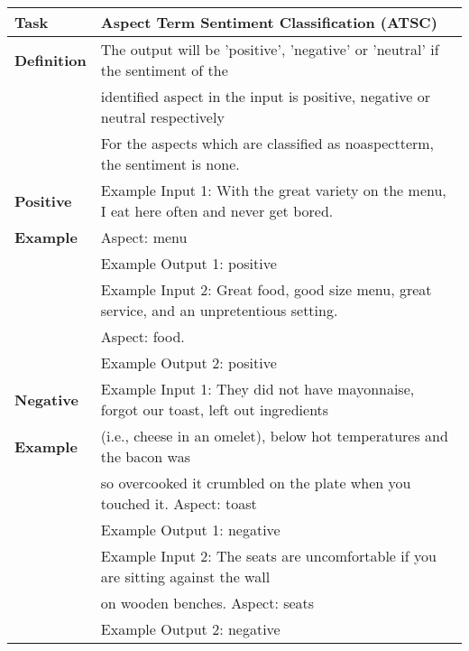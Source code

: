 \documentclass[11pt]{article}
\begin{document}
\begin{table*}[]
\begin{tabular}{ll}
\hline
\textbf{Task}             & Aspect Term Sentiment Classification (ATSC)                                                  \\ \hline
\textbf{Definition} & The output will be 'positive', 'negative' or 'neutral' if the sentiment of the \\
\textbf{}           & identified aspect in the input is positive, negative or neutral respectively \\
\textbf{}           & For the aspects which are classified as noaspectterm, the sentiment is none.                  \\ \hline
\textbf{Positive}           & Example Input 1: With the great variety on the menu, I eat here often and never get bored.\\
\textbf{Example}           & Aspect: menu\\
\textbf{}                 & Example Output 1: positive                                                        \\
\textbf{}           & Example Input 2: Great food, good size menu, great service, and an unpretentious setting.\\
\textbf{}           & Aspect: food.\\
\textbf{}                 & Example Output 2: positive                                                        \\ \hline
\textbf{Negative}           & Example Input 1: They did not have mayonnaise, forgot our toast,  left out ingredients                   \\
\textbf{Example}                 & (i.e., cheese in an omelet), below hot temperatures and the bacon was      \\
\textbf{}           & so overcooked it crumbled on the plate when you touched it. Aspect: toast                     \\
\textbf{}                 & Example Output 1: negative                                                        \\
\textbf{}                 & Example Input 2: The seats are uncomfortable if you are sitting against the wall  \\
\textbf{}                 & on wooden benches. Aspect: seats                                        \\
\textbf{}                 & Example Output 2: negative                                                        \\ \hline

\end{tabular}
\end{table*}
\end{document}
